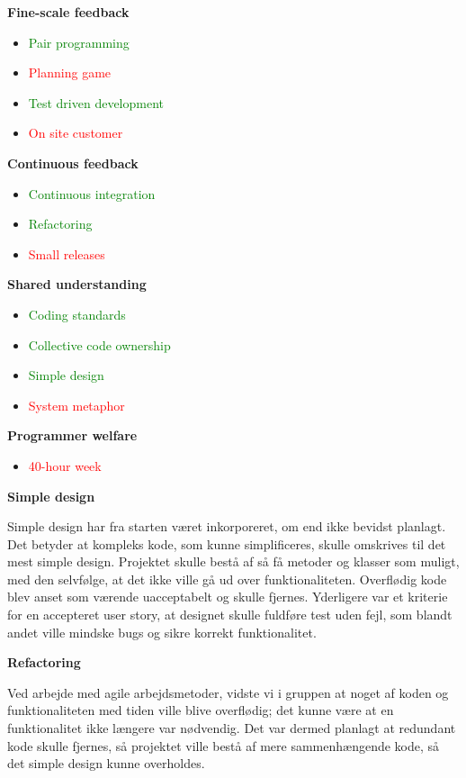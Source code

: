 \documentclass[11pt]{report}
\begin{document}
\noindent\textbf{Fine-scale feedback}
\begin{itemize}
  \item \textcolor{green}{Pair programming}
  \item \textcolor{red}{Planning game}
  \item \textcolor{green}{Test driven development}
  \item \textcolor{red}{On site customer}
\end{itemize}
\textbf{Continuous feedback}
\begin{itemize}
  \item \textcolor{green}{Continuous integration}
  \item \textcolor{green}{Refactoring}
  \item \textcolor{red}{Small releases}
\end{itemize}
\newpage
\noindent\textbf{Shared understanding}
\begin{itemize}
  \item \textcolor{green}{Coding standards}
  \item \textcolor{green}{Collective code ownership}
  \item \textcolor{green}{Simple design}
  \item \textcolor{red}{System metaphor}
\end{itemize}
\textbf{Programmer welfare}
\begin{itemize}
  \item \textcolor{red}{40-hour week}
\end{itemize}

\noindent\textbf{Simple design}

Simple design har fra starten været inkorporeret, om end ikke bevidst planlagt. Det betyder at kompleks kode, som kunne simplificeres, skulle omskrives til det mest simple design. Projektet skulle bestå af så få metoder og klasser som muligt, med den selvfølge, at det ikke ville gå ud over funktionaliteten. Overflødig kode blev anset som værende uacceptabelt og skulle fjernes. Yderligere var et kriterie for en accepteret user story, at designet skulle fuldføre test uden fejl, som blandt andet ville mindske bugs og sikre korrekt funktionalitet.

\noindent\textbf{Refactoring}

Ved arbejde med agile arbejdsmetoder, vidste vi i gruppen at noget af koden og funktionaliteten med tiden ville blive overflødig; det kunne være at en funktionalitet ikke længere var nødvendig. Det var dermed planlagt at redundant kode skulle fjernes, så projektet ville bestå af mere sammenhængende kode, så det simple design kunne overholdes.
\end{document}

